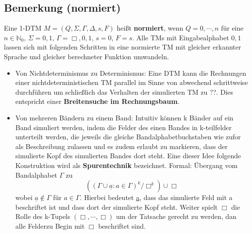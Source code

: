 \subsection{Bemerkung (normiert)} Eine 1-DTM $M = (Q, \Sigma, \Gamma, \Delta, s, F)$ heißt \textbf{normiert}, wenn $Q = {0,\cdots, n}$ für eine $n \in \mathbb{N}_{0}$, $\Sigma = {0, 1}$, $\Gamma = {\Box, 0, 1}$, $s = 0$, $F = {s}$. Alle TMs mit Eingabealphabet ${0,1}$ lassen sich mit folgenden Schritten in eine normierte TM mit gleicher erkannter Sprache und gleicher berechneter Funktion umwandeln. 
\begin{itemize}
  \item Von Nichtdeterminismus zu Determinismus: Eine DTM kann die Rechnungen einer nichtdeterministischen TM parallel im Sinne von abwechend schrittweise durchführen um schließlich das Verhalten der simulierten TM zu ??. Dies entspricht einer \textbf{Breitensuche im Rechnungsbaum}. 
  \begin{center}
\end{center}
  \item Von mehreren Bändern zu einem Band: Intuitiv können k Bänder auf ein Band simuliert werden, indem die Felder des einen Bandes in k-teilfelder unterteilt werden, die jeweils die gleiche Bandalphabetbuchstaben wie zufor als Beschreibung zulassen und es zudem erlaubt zu markieren, dass der simulierte Kopf des simulierten Bandes dort steht. Eine dieser Idee folgende Konstruktion wird als \textbf{Spurentechnik} bezeichnet. Formal: Übergang vom Bandalphabet $\Gamma$ zu \[((\Gamma \cup{\underline{a} : a \in \Gamma})^{k}/{\Box}^{k}) \cup {\Box}\] 
  wobei $\underline{a} \not \in \Gamma$ für $a \in \Gamma$. Hierbei bedeutet \underline{a}, dass das simulierte Feld mit a beschriftet ist und dass dort der simulierte Kopf steht. Weiter spielt $\Box$ die Rolle des k-Tupels $(\Box, \cdots, \Box)$ um der Tatsache gerecht zu werden, dan alle Felderzu Begin mit $\Box$ beschriftet sind.
  \begin{center}
    \begin{tikzpicture}[cell/.style={rectangle, draw=black, minimum size=1cm}, node distance=0cm]


\end{tikzpicture}
\end{center}
\end{itemize}
